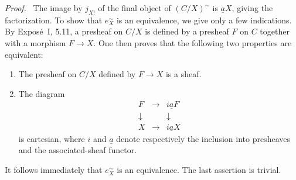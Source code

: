 \documentclass[11pt]{article}
\newenvironment{prooftext}{\par\noindent\emph{Proof.}\ }{\par\medskip}
\begin{document}
\begin{prooftext}
The image by \(j_{X!}\) of the final object of \((C/X)^{\sim}\) is \(\underline aX\), giving the factorization. To show that \(e_X^{\sim}\) is an equivalence, we give only a few indications. By Expos\'e~I, 5.11, a presheaf on \(C/X\) is defined by a presheaf \(F\) on \(C\) together with a morphism \(F\to X\). One then proves that the following two properties are equivalent:
\begin{enumerate}[label=\roman*)]
\item The presheaf on \(C/X\) defined by \(F\to X\) is a sheaf.
\item The diagram
\[
\begin{array}{ccc}
F&\longrightarrow&i\underline aF\\
\downarrow&&\downarrow\\
X&\longrightarrow&i\underline aX
\end{array}
\]
is cartesian, where \(i\) and \(\underline a\) denote respectively the inclusion into presheaves and the associated-sheaf functor.
\end{enumerate}
It follows immediately that \(e_X^{\sim}\) is an equivalence. The last assertion is trivial.
\end{prooftext}
\end{document}
